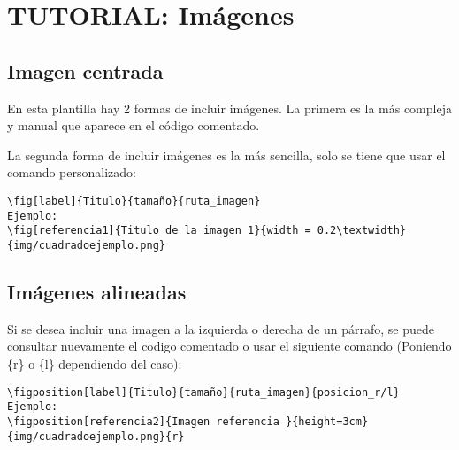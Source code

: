 \section{TUTORIAL: Imágenes}
\subsection{Imagen centrada}
En esta plantilla hay 2 formas de incluir imágenes. La primera es la más compleja y manual que aparece en el código comentado.

La segunda forma de incluir imágenes es la más sencilla, solo se tiene que usar el comando personalizado:
\begin{verbatim} 
\fig[label]{Titulo}{tamaño}{ruta_imagen}
Ejemplo:
\fig[referencia1]{Titulo de la imagen 1}{width = 0.2\textwidth}{img/cuadradoejemplo.png}
\end{verbatim}



\subsection{Imágenes alineadas}
Si se desea incluir una imagen a la izquierda o derecha de un párrafo, se puede consultar nuevamente el codigo comentado o usar el siguiente comando (Poniendo \{r\} o \{l\} dependiendo del caso):
\begin{verbatim} 
\figposition[label]{Titulo}{tamaño}{ruta_imagen}{posicion_r/l}
Ejemplo:
\figposition[referencia2]{Imagen referencia }{height=3cm}{img/cuadradoejemplo.png}{r}
\end{verbatim}


